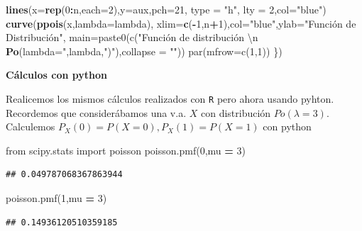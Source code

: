 \documentclass[]{book}
\newenvironment{Shaded}{\begin{snugshade}}{\end{snugshade}}
\newcommand{\DataTypeTok}[1]{\textcolor[rgb]{0.13,0.29,0.53}{#1}}
\newcommand{\DecValTok}[1]{\textcolor[rgb]{0.00,0.00,0.81}{#1}}
\newcommand{\ImportTok}[1]{#1}
\newcommand{\KeywordTok}[1]{\textcolor[rgb]{0.13,0.29,0.53}{\textbf{#1}}}
\newcommand{\NormalTok}[1]{#1}
\newcommand{\OperatorTok}[1]{\textcolor[rgb]{0.81,0.36,0.00}{\textbf{#1}}}
\newcommand{\StringTok}[1]{\textcolor[rgb]{0.31,0.60,0.02}{#1}}
\begin{document}
\begin{Shaded}
\begin{Highlighting}[]
  \KeywordTok{lines}\NormalTok{(}\DataTypeTok{x=}\KeywordTok{rep}\NormalTok{(}\DecValTok{0}\OperatorTok{:}\NormalTok{n,}\DataTypeTok{each=}\DecValTok{2}\NormalTok{),}\DataTypeTok{y=}\NormalTok{aux,}\DataTypeTok{pch=}\DecValTok{21}\NormalTok{, }\DataTypeTok{type =} \StringTok{"h"}\NormalTok{, }\DataTypeTok{lty =} \DecValTok{2}\NormalTok{,}\DataTypeTok{col=}\StringTok{"blue"}\NormalTok{)}
  \KeywordTok{curve}\NormalTok{(}\KeywordTok{ppois}\NormalTok{(x,}\DataTypeTok{lambda=}\NormalTok{lambda),}
        \DataTypeTok{xlim=}\KeywordTok{c}\NormalTok{(}\OperatorTok{-}\DecValTok{1}\NormalTok{,n}\OperatorTok{+}\DecValTok{1}\NormalTok{),}\DataTypeTok{col=}\StringTok{"blue"}\NormalTok{,}\DataTypeTok{ylab=}\StringTok{"Función de Distribución",}
\StringTok{         main=paste0(c("}\NormalTok{Función de distribución \textbackslash{}n }\KeywordTok{Po}\NormalTok{(}\DataTypeTok{lambda=}\StringTok{",lambda,"}\NormalTok{)}\StringTok{"),collapse = ""))}
\StringTok{  par(mfrow=c(1,1))}
\StringTok{\})}
\end{Highlighting}
\end{Shaded}

\textbf{Cálculos con python}

Realicemos los mismos cálculos realizados con \texttt{R} pero ahora usando pyhton. Recordemos que considerábamos una v.a. \(X\) con distribución \(Po(\lambda=3)\). Calculemos \(P_X(0)=P(X=0), P_X(1)=P(X=1)\) con python

\begin{Shaded}
\begin{Highlighting}[]
\ImportTok{from}\NormalTok{ scipy.stats }\ImportTok{import}\NormalTok{ poisson}
\NormalTok{poisson.pmf(}\DecValTok{0}\NormalTok{,mu }\OperatorTok{=} \DecValTok{3}\NormalTok{)}
\end{Highlighting}
\end{Shaded}

\begin{verbatim}
## 0.049787068367863944
\end{verbatim}

\begin{Shaded}
\begin{Highlighting}[]
\NormalTok{poisson.pmf(}\DecValTok{1}\NormalTok{,mu }\OperatorTok{=} \DecValTok{3}\NormalTok{)}
\end{Highlighting}
\end{Shaded}

\begin{verbatim}
## 0.14936120510359185
\end{verbatim}
\end{document}
